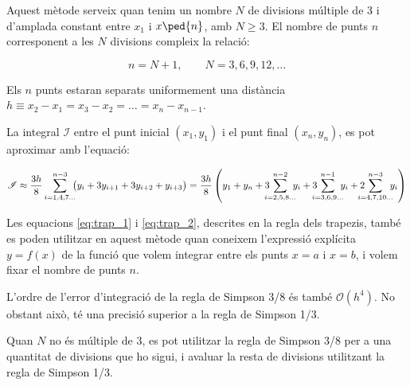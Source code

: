 Aquest mètode serveix quan tenim un nombre  $N$ de divisions múltiple de 3 i d'amplada constant entre $x_1$ i $x\ped{n}$, amb $N \geq 3$.  El nombre de punts $n$ corresponent a les $N$ divisions  compleix la relació:

\begin{equation}
	n = N+1,\qquad N = 3, 6, 9, 12, \dots
\end{equation}
 
Els $n$ punts estaran separats uniformement una distància $h \equiv x_2-x_1 = x_3-x_2 = \dots = x_n-x_{n-1}$.

La integral $\mathscr{I}$ entre el punt inicial $(x_1, y_1)$ i el punt final $(x_n, y_n)$, es pot aproximar amb l'equació:

 \begin{equation}\label{eq:simp_3_8}
   \mathscr{I} \approx  \frac{3h}{8} \sum_{i=1,4,7\dots}^{n-3} \hspace{-0.5em} \big( y_i + 3 y_{i+1} + 3 y_{i+2} + y_{i+3}\big) =
   \frac{3h}{8} \left( y_1 + y_n + 3 \hspace{-0.7em} \sum_{i=2,5,8\dots}^{n-2} \hspace{-0.5em} y_i +
   3 \hspace{-0.7em} \sum_{i=3,6,9\dots}^{n-1} \hspace{-0.5em} y_i
   + 2 \hspace{-0.9em} \sum_{i=4,7,10\dots}^{n-3} \hspace{-0.5em} y_i \right)
 \end{equation}

 Les equacions \eqref{eq:trap_1} i \eqref{eq:trap_2}, descrites en la regla dels trapezis, també es poden utilitzar en aquest mètode quan  coneixem l'expressió explícita $y=f(x)$ de la funció que volem integrar entre els punts $x=a$ i $x=b$, i volem fixar el nombre de punts $n$.

 L'ordre de l'error d'integració de la regla de Simpson 3/8 és també $\mathscr{O}(h^4)$. No obstant això, té una precisió superior a la regla de Simpson 1/3.
 
 Quan  $N$ no és múltiple de 3, es pot utilitzar la regla de Simpson 3/8 per a una quantitat de divisions que ho sigui, i avaluar la resta de divisions utilitzant la  regla de Simpson 1/3.


